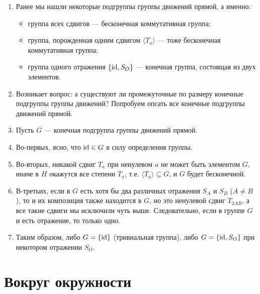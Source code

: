 \begin{enumerate}
\item Ранее мы нашли некоторые подгруппы группы движений прямой, а именно:
\begin{itemize}
\item группа всех сдвигов --- бесконечная коммутативная группа;
\item группа, порожденная одним сдвигом $\langle T_a\rangle$ --- тоже бесконечная коммутативная группа;
\item группа одного отражения $\{\mathrm{id}, S_O\}$ --- конечная группа, состоящая из двух элементов.
\end{itemize}
\item Возникает вопрос: а существуют ли промежуточные по размеру конечные подгруппы группы движений? Попробуем опсать все конечные подгруппы движений прямой.
\item Пусть $G$ --- конечная подгруппа группы движений прямой.
\item Во-первых, ясно, что $\mathrm{id}\in G$ в силу определения группы.
\item Во-вторых, никакой сдвиг $T_a$ при ненулевом $a$ не может быть элементом $G$, иначе в $H$ окажутся все степени $T_a$, т.е. $\langle T_a\rangle \subseteq G$, и $G$ будет бесконечной.
\item В-третьих, если в $G$ есть хотя бы два различных отражения $S_A$ и $S_B$ ($A\ne B$), то и их композиция также находится в $G$, но это ненулевой сдвиг $T_{2AB}$, а все такие сдвиги мы исключили чуть выше. Следовательно, если в группе $G$ и есть отражение, то только одно.
\item Таким образом, либо $G=\{\mathrm{id}\}$ (тривиальная группа), либо $G=\{\mathrm{id}, S_O\}$ при некотором отражении $S_O$.
\end{enumerate}


\chapter{Вокруг окружности}


